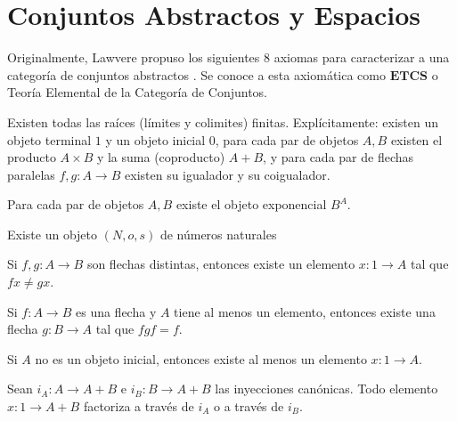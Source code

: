 \chapter{Conjuntos Abstractos y Espacios}
\label{conjuntos}

Originalmente, Lawvere propuso los siguientes $8$ axiomas para caracterizar a una categoría
de conjuntos abstractos \cite{lawvere1964elementary}. Se conoce a esta axiomática como $\textbf{ETCS}$
o Teoría Elemental de la Categoría de Conjuntos.

\begin{axiom}
Existen todas las raíces (límites y colimites) finitas. Explícitamente:
existen un objeto terminal $1$ y un objeto inicial $0$, para cada par de objetos
$A,B$ existen el producto $A\times B$ y la suma (coproducto) $A+B$, y para cada
par de flechas paralelas $f,g\colon A\to B$ existen su igualador y su coigualador.
\end{axiom}

\begin{axiom}[Exponenciación]
Para cada par de objetos $A,B$ existe el objeto exponencial $B^{A}$.
\end{axiom}

\begin{axiom}
Existe un objeto $(N,o,s)$ de números naturales
\end{axiom}

\begin{axiom}[$1$ es un separador]
Si $f,g\colon A\to B$ son flechas distintas, entonces existe un elemento
$x\colon 1\to A$ tal que $fx\neq gx$.
\end{axiom}

\begin{axiom}
Si $f\colon A\to B$ es una flecha y $A$ tiene al menos un elemento, entonces
existe una flecha $g\colon B\to A$ tal que $fgf=f$.
\end{axiom}

\begin{axiom}
Si $A$ no es un objeto inicial, entonces existe al menos un elemento
$x\colon 1\to A$.
\end{axiom}

\begin{axiom}
Sean $i_A\colon A\to A+B$ e $i_B\colon B\to A+B$ las inyecciones canónicas.
Todo elemento $x\colon 1\to A+B$ factoriza a través de $i_A$ o a través de
$i_B$.
\end{axiom}

